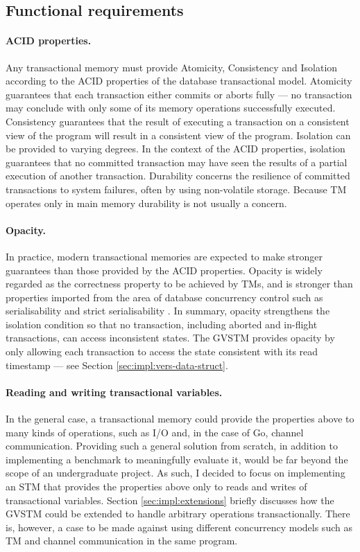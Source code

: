 \documentclass[12pt,a4paper,oneside,openright]{report}
\begin{document}
\subsection{Functional requirements}
\label{sec:prep:techn-requ}

\paragraph{ACID properties.} Any transactional memory must provide
Atomicity, Consistency and Isolation according to the ACID properties
of the database transactional model. Atomicity guarantees that each
transaction either commits or aborts fully --- no transaction may
conclude with only some of its memory operations successfully
executed. Consistency guarantees that the result of executing a
transaction on a consistent view of the program will result in a
consistent view of the program. Isolation can be provided to varying
degrees. In the context of the ACID properties, isolation guarantees
that no committed transaction may have seen the results of a partial
execution of another transaction. Durability concerns the resilience
of committed transactions to system failures, often by using
non-volatile storage. Because TM operates only in main memory
durability is not usually a concern.

\paragraph{Opacity.} In practice, modern transactional memories are
expected to make stronger guarantees than those provided by the ACID
properties. Opacity \cite{Opacity} is widely regarded as the
correctness property to be achieved by TMs, and is stronger than
properties imported from the area of database concurrency control such
as serialisability and strict serialisability
\cite{Serialisability}. In summary, opacity strengthens the isolation
condition so that no transaction, including aborted and in-flight
transactions, can access inconsistent states. The GVSTM provides
opacity by only allowing each transaction to access the state
consistent with its read timestamp --- see Section
\ref{sec:impl:vers-data-struct}.

\paragraph{Reading and writing transactional variables.} In the
general case, a transactional memory could provide the properties
above to many kinds of operations, such as I/O and, in the case of Go,
channel communication. Providing such a general solution from scratch,
in addition to implementing a benchmark to meaningfully evaluate it,
would be far beyond the scope of an undergraduate project. As such, I
decided to focus on implementing an STM that provides the properties
above only to reads and writes of transactional variables. Section
\ref{sec:impl:extensions} briefly discusses how the GVSTM could be
extended to handle arbitrary operations transactionally. There is,
however, a case to be made against using different concurrency models
such as TM and channel communication in the same program.
\end{document}
